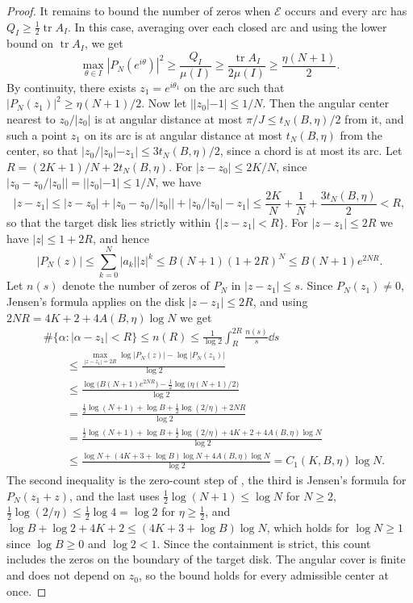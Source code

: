 \begin{proof}
It remains to bound the number of zeros when $\mathcal E$ occurs and
every arc has $Q_I\ge\tfrac12\operatorname{tr}A_I$.
In this case, averaging over each closed arc and using the lower bound on
$\operatorname{tr}A_I$, we get
\[
 \max_{\theta\in I}|P_N(e^{i\theta})|^2\ge\frac{Q_I}{\mu(I)}
 \ge\frac{\operatorname{tr}A_I}{2\mu(I)}\ge\frac{\eta(N+1)}2.
\]
By continuity, there exists $z_1=e^{i\theta_1}$ on the arc such that
$|P_N(z_1)|^2\ge\eta(N+1)/2$.
Now let $||z_0|-1|\le1/N$.
Then the angular center nearest to $z_0/|z_0|$ is at angular distance at
most $\pi/J\le t_N(B,\eta)/2$ from it, and such a point $z_1$ on its arc
is at angular distance at most $t_N(B,\eta)$ from the center, so that
$|z_0/|z_0|-z_1|\le3t_N(B,\eta)/2$, since a chord is at most its arc.
Let $R=(2K+1)/N+2t_N(B,\eta)$. For $|z-z_0|\le2K/N$, since
$\bigl|z_0-z_0/|z_0|\bigr|=||z_0|-1|\le1/N$, we have
\[
 |z-z_1|\le|z-z_0|+\bigl|z_0-z_0/|z_0|\bigr|+\bigl|z_0/|z_0|-z_1\bigr|
 \le\frac{2K}N+\frac1N+\frac{3t_N(B,\eta)}2<R,
\]
so that the target disk lies strictly within $\{|z-z_1|<R\}$.
For $|z-z_1|\le2R$ we have $|z|\le1+2R$, and hence
\[
 |P_N(z)|\le\sum_{k=0}^N|a_k||z|^k\le B(N+1)(1+2R)^N\le B(N+1)e^{2NR}.
\]
Let $n(s)$ denote the number of zeros of $P_N$ in $|z-z_1|\le s$.
Since $P_N(z_1)\ne0$, Jensen's formula applies on the disk $|z-z_1|\le2R$,
and using $2NR=4K+2+4A(B,\eta)\log N$ we get
\begin{align*}
 &\#\{\alpha:|\alpha-z_1|<R\}
 \le n(R)\le\frac1{\log2}\int_R^{2R}\frac{n(s)}s\dd s\\
 &\qquad\le\frac{\max_{|z-z_1|=2R}\log|P_N(z)|-\log|P_N(z_1)|}{\log2}\\
 &\qquad\le\frac{\log\bigl(B(N+1)e^{2NR}\bigr)
   -\tfrac12\log\bigl(\eta(N+1)/2\bigr)}{\log2}\\
 &\qquad=\frac{\tfrac12\log(N+1)+\log B+\tfrac12\log(2/\eta)+2NR}{\log2}\\
 &\qquad=\frac{\tfrac12\log(N+1)+\log B+\tfrac12\log(2/\eta)
   +4K+2+4A(B,\eta)\log N}{\log2}\\
 &\qquad\le\frac{\log N+(4K+3+\log B)\log N+4A(B,\eta)\log N}{\log2}
 =C_1(K,B,\eta)\log N.
\end{align*}
The second inequality is the zero-count step of
\cite[\S8.21]{Titchmarsh1939}, the third is Jensen's formula
\cite[\S3.61]{Titchmarsh1939} for $P_N(z_1+z)$, and the last uses
$\tfrac12\log(N+1)\le\log N$ for $N\ge2$,
$\tfrac12\log(2/\eta)\le\tfrac12\log4=\log2$ for $\eta\ge\tfrac12$, and
$\log B+\log2+4K+2\le(4K+3+\log B)\log N$, which holds for
$\log N\ge1$ since $\log B\ge0$ and $\log2<1$.
Since the containment is strict, this count includes the zeros on the
boundary of the target disk. The angular cover is finite and does not
depend on $z_0$, so the bound holds for every admissible center at once.
\end{proof}


